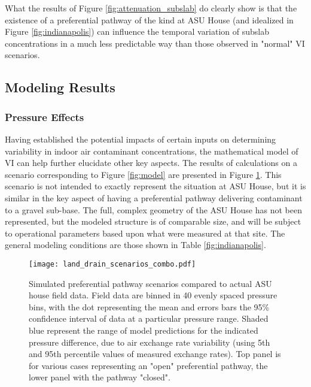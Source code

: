 What the results of Figure \ref{fig:attenuation_subslab} do clearly show is that the existence of a preferential pathway of the kind at ASU House (and idealized in Figure \ref{fig:indianapolis}) can influence the temporal variation of subslab concentrations in a much less predictable way than those observed in "normal" VI scenarios.\par

\subsection{Modeling Results}\label{s:results_model}

\subsubsection{Pressure Effects}\label{s:results_model_pressure}

Having established the potential impacts of certain inputs on determining variability in indoor air contaminant concentrations, the mathematical model of VI can help further elucidate other key aspects.
The results of calculations on a scenario corresponding to Figure \ref{fig:model} are presented in Figure \ref{fig:land_drain_scenarios}.
This scenario is not intended to exactly represent the situation at ASU House, but it is similar in the key aspect of having a preferential pathway delivering contaminant to a gravel sub-base.
The full, complex geometry of the ASU House has not been represented, but the modeled structure is of comparable size, and will be subject to operational parameters based upon what were measured at that site.
The general modeling conditions are those shown in Table \ref{fig:indianapolis}.\par

\begin{figure}[htb!]
 \centering
 \texttt{[image: land\_drain\_scenarios\_combo.pdf]}
 \caption{Simulated preferential pathway scenarios compared to actual ASU house field data. Field data are binned in 40 evenly spaced pressure bins, with the dot representing the mean and errors bars the 95\% confidence interval of data at a particular pressure range. Shaded blue represent the range of model predictions for the indicated pressure difference, due to air exchange rate variability (using 5th and 95th percentile values of measured exchange rates). Top panel is for various cases representing an "open" preferential pathway, the lower panel with the pathway "closed".}\label{fig:land_drain_scenarios}
\end{figure}

